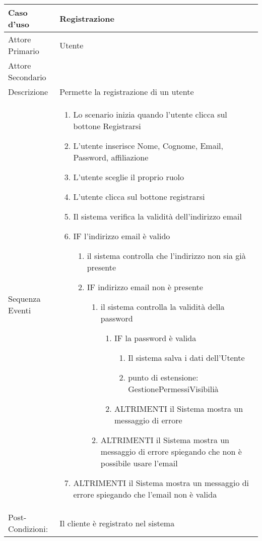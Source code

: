 \begin{tabular}{|p{3cm}|p{7cm}|}
\hline 
\rowcolor{Orchid}
  Caso d'uso & Registrazione \\
  \hline
  Attore Primario & Utente\\
  \hline
Attore Secondario & \\
\hline
Descrizione & Permette la registrazione di un utente\\
\hline
  Sequenza Eventi &
    \begin{enumerate}
    \item Lo scenario inizia quando l'utente clicca sul bottone Registrarsi
    \item L'utente inserisce Nome, Cognome, Email, Password, affiliazione
    \item L'utente sceglie il proprio ruolo
    \item L'utente clicca sul bottone registrarsi
    \item Il sistema verifica la validità dell'indirizzo email
    \item IF l'indirizzo email è valido
   \begin{enumerate}
    \item il sistema controlla che l'indirizzo non sia già presente
     \item IF indirizzo email non è presente
       \begin{enumerate}
         \item il sistema controlla la validità della password
           \begin{enumerate}
            \item IF la password è valida
               \begin{enumerate}
               \item Il sistema salva i dati dell'Utente
               \item punto di estensione: GestionePermessiVisibilià
               \end{enumerate}
            \item ALTRIMENTI il Sistema mostra un messaggio di errore
          \end{enumerate}
        \item ALTRIMENTI il Sistema mostra un messaggio di errore spiegando che non è possibile usare l'email
       \end{enumerate}         
      \end{enumerate}
 \item ALTRIMENTI il Sistema mostra un messaggio di errore spiegando che l'email non è valida
  \end{enumerate}\\
\hline
Post-Condizioni: & Il cliente è registrato nel sistema \\
  \hline
\end{tabular}\\ 
